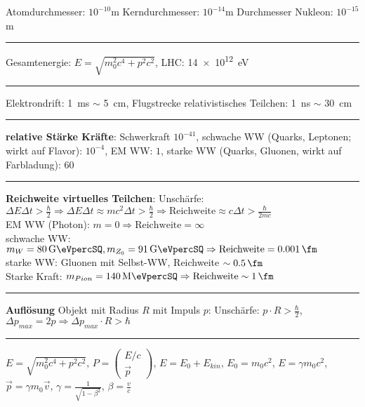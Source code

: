 \documentclass[10pt,twoside,a4paper]{article}
\newcommand{\Vek}[2]{\left(\begin{array}{c}#1\\#2\end{array}\right)}
\begin{document}
\begin{multicols*}{3}

\lsstyle

Atomdurchmesser: $10^{-10}$\si{\meter}   Kerndurchmesser: $10^{-14}$\si{\meter}    Durchmesser Nukleon: $10^{-15}$\si{\meter}
\\ \rule[0ex]{\columnwidth}{0.5pt}
Gesamtenergie: $E = \sqrt{m_0^2 c^4 + p^2 c^2}$, LHC: \SI{14e12}{\eV}
\\ \rule[0ex]{\columnwidth}{0.5pt}
Elektrondrift: \SI{1}{\milli\second} $\sim$ \SI{5}{\cm}, Flugstrecke relativistisches Teilchen: \SI{1}{\nano\second} $\sim$ \SI{30}{\cm}
\\ \rule[0ex]{\columnwidth}{0.5pt}
\textbf{relative Stärke Kräfte}: Schwerkraft $10^{-41}$, schwache WW (Quarks, Leptonen; wirkt auf Flavor): $10^{-4}$, EM WW: $1$, starke WW (Quarks, Gluonen, wirkt auf Farbladung): $60$
\\ \rule[0ex]{\columnwidth}{0.4pt}
\textbf{Reichweite virtuelles Teilchen}: Unschärfe: $\Delta E \Delta t > \frac{\hbar}{2} \Rightarrow \Delta E \Delta t \approx mc^2 \Delta t > \frac{\hbar}{2} \Rightarrow \text{Reichweite} \approx c \Delta t > \frac{\hbar}{2mc}$ \\
EM WW (Photon): $m = 0 \Rightarrow \text{Reichweite} = \infty$ \\
schwache WW: $m_W = \SI[per-mode=symbol,per-symbol=/]{80}{\giga\eVpercSQ}, m_{Z_0} = \SI[per-mode=symbol,per-symbol=/]{91}{\giga\eVpercSQ} \Rightarrow \text{Reichweite} = \SI{0.001}{\fm}$  \\
starke WW: Gluonen mit Selbst-WW, Reichweite $\sim \SI{0.5}{\fm}$ \\
Starke Kraft: $m_{Pion} = \SI[per-mode=symbol,per-symbol=/]{140}{\mega\eVpercSQ} \Rightarrow \text{Reichweite} \sim \SI{1}{\fm}$
\\ \rule[0ex]{\columnwidth}{0.5pt}
\textbf{Auflösung} Objekt mit Radius $R$ mit Impuls $p$: Unschärfe: $p \cdot R > \frac{\hbar}{2}$, $\Delta p_{max} = 2p \Rightarrow \Delta p_{max} \cdot R > \hbar$
\\ \rule[0ex]{\columnwidth}{0.5pt}
$E = \sqrt{m_0^2 c^4 + p^2 c^2}$, $P = \Vek{E/c}{\vec{p}}$, $E = E_0 + E_{kin}$, $E_0 = m_0 c^2$, $E = \gamma m_0 c^2$, $\vec{p} = \gamma m_0 \vec{v}$, $\gamma = \frac{1}{\sqrt{1 - \beta^2}}$, $\beta = \frac{v}{c}$ \\

\end{multicols*}
\end{document}

